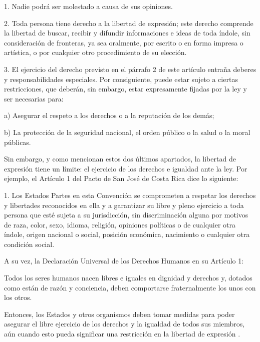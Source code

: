 \begin{displayquote}
1. Nadie podrá ser molestado a causa de sus opiniones.

2. Toda persona tiene derecho a la libertad de expresión; este derecho comprende la libertad de buscar, recibir y difundir informaciones e ideas de toda índole, sin consideración de fronteras, ya sea oralmente, por escrito o en forma impresa o artística, o por cualquier otro procedimiento de su elección.

3. El ejercicio del derecho previsto en el párrafo 2 de este artículo entraña deberes y responsabilidades especiales. Por consiguiente, puede estar sujeto a ciertas restricciones, que deberán, sin embargo, estar expresamente fijadas por la ley y ser necesarias para:

a) Asegurar el respeto a los derechos o a la reputación de los demás;

b) La protección de la seguridad nacional, el orden público o la salud o la moral públicas.
\end{displayquote}

Sin embargo, y como mencionan estos dos últimos apartados, la libertad de expresión tiene un límite: el ejercicio de los derechos e igualdad ante la ley. Por ejemplo, el Artículo 1 del Pacto de San José de Costa Rica dice lo siguiente:

\begin{displayquote}
    1. Los Estados Partes en esta Convención se comprometen a respetar los derechos y libertades reconocidos en ella y a garantizar su libre y pleno ejercicio a toda persona que esté sujeta a su jurisdicción, sin discriminación alguna por motivos de raza, color, sexo, idioma, religión, opiniones políticas o de cualquier otra índole, origen nacional o social, posición económica, nacimiento o cualquier otra condición social.
\end{displayquote}

A su vez, la Declaración Universal de los Derechos Humanos en su Artículo 1:

\begin{displayquote}
    Todos los seres humanos nacen libres e iguales en dignidad y derechos y, dotados como están de razón y conciencia, deben comportarse fraternalmente los unos con los otros.
\end{displayquote}

Entonces, los Estados y otros organismos deben tomar medidas para poder asegurar el libre ejercicio de los derechos y la igualdad de todos sus miembros, aún cuando esto pueda significar una restricción en la libertad de expresión \cite{article192015}.


